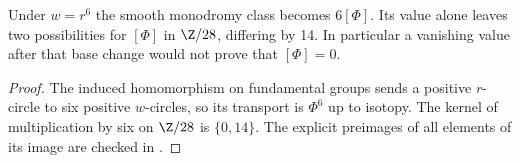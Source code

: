 \begin{proposition}
Under $w=r^6$ the smooth monodromy class becomes $6[\Phi]$.
Its value alone leaves two possibilities for $[\Phi]$ in $\Z/28$,
differing by 14. In particular a vanishing value after that base
change would not prove that $[\Phi]=0$.
\end{proposition}
\begin{proof}
The induced homomorphism on fundamental groups sends a positive
$r$-circle to six positive $w$-circles, so its transport is
$\Phi^6$ up to isotopy. The kernel of multiplication by six on
$\Z/28$ is $\{0,14\}$. The explicit preimages of all elements
of its image are checked in .
\end{proof}

